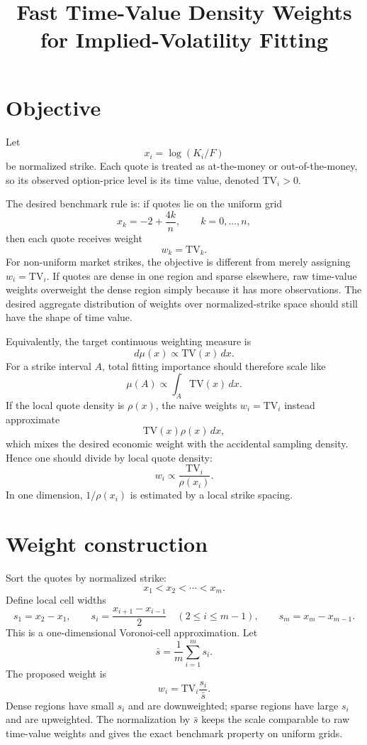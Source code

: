 \documentclass[9pt,a4paper]{extarticle}
\title{Fast Time-Value Density Weights for Implied-Volatility Fitting}
\author{}
\date{}
\begin{document}
\maketitle
\vspace{-2.6em}

\section*{Objective}
Let
\[
  x_i=\log(K_i/F)
\]
be normalized strike. Each quote is treated as at-the-money or out-of-the-money, so its observed option-price level is its time value, denoted $\mathrm{TV}_i>0$.

The desired benchmark rule is: if quotes lie on the uniform grid
\[
  x_k=-2+\frac{4k}{n},\qquad k=0,\ldots,n,
\]
then each quote receives weight
\[
  w_k=\mathrm{TV}_k.
\]
For non-uniform market strikes, the objective is different from merely assigning $w_i=\mathrm{TV}_i$. If quotes are dense in one region and sparse elsewhere, raw time-value weights overweight the dense region simply because it has more observations. The desired aggregate distribution of weights over normalized-strike space should still have the shape of time value.

Equivalently, the target continuous weighting measure is
\[
  d\mu(x)\propto \mathrm{TV}(x)\,dx.
\]
For a strike interval $A$, total fitting importance should therefore scale like
\[
  \mu(A)\propto \int_A \mathrm{TV}(x)\,dx.
\]
If the local quote density is $\rho(x)$, the naive weights $w_i=\mathrm{TV}_i$ instead approximate
\[
  \mathrm{TV}(x)\rho(x)\,dx,
\]
which mixes the desired economic weight with the accidental sampling density. Hence one should divide by local quote density:
\[
  w_i\propto \frac{\mathrm{TV}_i}{\rho(x_i)}.
\]
In one dimension, $1/\rho(x_i)$ is estimated by a local strike spacing.

\section*{Weight construction}
Sort the quotes by normalized strike:
\[
  x_1<x_2<\cdots<x_m.
\]
Define local cell widths
\[
  s_1=x_2-x_1,\qquad
  s_i=\frac{x_{i+1}-x_{i-1}}{2}\quad(2\le i\le m-1),\qquad
  s_m=x_m-x_{m-1}.
\]
This is a one-dimensional Voronoi-cell approximation. Let
\[
  \bar{s}=\frac{1}{m}\sum_{i=1}^m s_i.
\]
The proposed weight is
\[
  \boxed{w_i=\mathrm{TV}_i\frac{s_i}{\bar{s}}.}
\]
Dense regions have small $s_i$ and are downweighted; sparse regions have large $s_i$ and are upweighted. The normalization by $\bar{s}$ keeps the scale comparable to raw time-value weights and gives the exact benchmark property on uniform grids.
\end{document}
